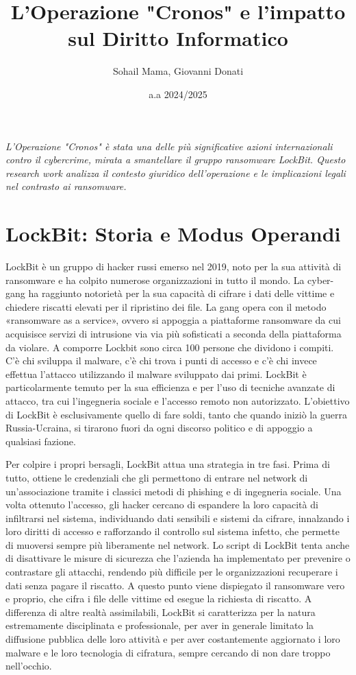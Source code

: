 \documentclass[a4paper,12pt]{article}
\title{L'Operazione "Cronos" e l'impatto sul Diritto Informatico}
\author{Sohail Mama, Giovanni Donati}
\date{a.a 2024/2025}
\begin{document}
\maketitle

\vfill
\begin{center}
\textit{L'Operazione "Cronos" è stata una delle più significative azioni internazionali contro il cybercrime, mirata a smantellare il gruppo ransomware LockBit. Questo research work analizza il contesto giuridico dell'operazione e le implicazioni legali nel contrasto ai ransomware.}
\end{center}
\vfill

\newpage
\tableofcontents
\newpage

\section{LockBit: Storia e Modus Operandi}
LockBit è un gruppo di hacker russi emerso nel 2019, noto per la sua attività di ransomware e ha colpito numerose organizzazioni in tutto il mondo. La cyber-gang ha raggiunto notorietà per la sua capacità di cifrare i dati delle vittime e chiedere riscatti elevati per il ripristino dei file. La gang opera con il metodo «ransomware as a service», ovvero si appoggia a piattaforme ransomware da cui acquisisce servizi di intrusione via via più sofisticati a seconda della piattaforma da violare. A comporre Lockbit sono circa 100 persone che dividono i compiti. C'è chi sviluppa il malware, c'è chi trova i punti di accesso e c'è chi invece effettua l'attacco utilizzando il malware sviluppato dai primi. LockBit è particolarmente temuto per la sua efficienza e per l'uso di tecniche avanzate di attacco, tra cui l'ingegneria sociale e l'accesso remoto non autorizzato. L'obiettivo di LockBit è esclusivamente quello di fare soldi, tanto che quando iniziò la guerra Russia-Ucraina, si tirarono fuori da ogni discorso politico e di appoggio a qualsiasi fazione.

Per colpire i propri bersagli, LockBit attua una strategia in tre fasi. Prima di tutto, ottiene le credenziali che gli permettono di entrare nel network di un'associazione tramite i classici metodi di phishing e di ingegneria sociale.  Una volta ottenuto l'accesso, gli hacker cercano di espandere la loro capacità di infiltrarsi nel sistema, individuando dati sensibili e sistemi da cifrare, innalzando i loro diritti di accesso e rafforzando il controllo sul sistema infetto, che permette di muoversi sempre più liberamente nel network. Lo script di LockBit tenta anche di disattivare le misure di sicurezza che l'azienda ha implementato per prevenire o contrastare gli  attacchi, rendendo più difficile per le organizzazioni recuperare i dati senza pagare il riscatto. A questo punto viene dispiegato il ransomware vero e proprio, che cifra i file delle vittime ed esegue la richiesta di riscatto. A differenza di altre realtà assimilabili, LockBit si caratterizza per la natura estremamente disciplinata e professionale, per aver in generale limitato la diffusione pubblica delle loro attività e per aver costantemente aggiornato i loro malware e le loro tecnologia di cifratura, sempre cercando di non dare troppo nell'occhio.
\end{document}
